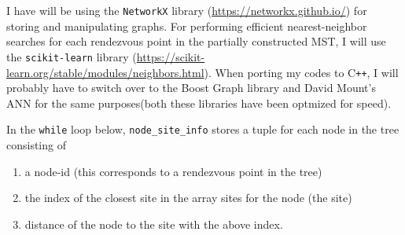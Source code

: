 \documentclass[11.5pt]{report}
\begin{document}
I have will be using the \verb|NetworkX| library (\url{https://networkx.github.io/}) for 
storing and manipulating graphs. For performing efficient nearest-neighbor searches for 
each rendezvous point in the partially constructed MST, I will use the \verb|scikit-learn| 
library (\url{https://scikit-learn.org/stable/modules/neighbors.html}). When porting 
my codes to C\texttt{++}, I will probably have to switch over to the Boost Graph library and 
David Mount's ANN for the same purposes(both these libraries have been optmized for speed). 

In the \verb|while| loop below, \verb|node_site_info| stores a tuple for each node in the tree 
consisting of
\begin{enumerate}
\item a node-id (this corresponds to a rendezvous point in the tree)
\item the index of the closest site in the array sites for the node (the site)
\item distance of the node to the site with the above index.
\end{enumerate}
\end{document}
